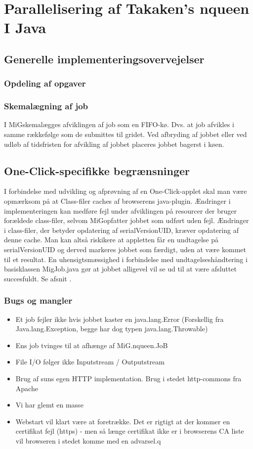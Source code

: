 \documentclass[draft,a4paper,10pt]{article}
\newcommand{\mig}{MiG}
\newcommand{\oc}{One-Click}
\begin{document}
\section{Parallelisering af Takaken's nqueen I Java}

\subsection{Generelle implementeringsovervejelser}
\subsubsection{Opdeling af opgaver}


\subsubsection{Skemalægning af job}
I \mig skemalægges afviklingen af job som en FIFO-kø. Dvs. at job afvikles i samme rækkefølge som de submittes til gridet. Ved afbryding af jobbet eller ved udløb af tidsfristen for afvikling af jobbet placeres jobbet bagerst i køen.  


\subsection{\oc-specifikke begrænsninger}

I forbindelse med udvikling og afprøvning af en \oc-applet skal man være opmærksom på at Class-filer caches af browserens java-plugin. Ændringer i implementeringen kan medføre fejl under afviklingen på resourcer der bruger forældede class-filer, selvom \mig opfatter jobbet som udført uden fejl. Ændringer i class-filer, der betyder opdatering af serialVersionUID, kræver opdatering af denne cache. Man kan altså riskikere at appletten får en undtagelse på serialVersionUID og derved markeres jobbet som færdigt, uden at være kommet til et resultat. En uhensigtsmæssighed i forbindelse med undtagelseshåndtering i basisklassen MigJob.java gør at jobbet alligevel vil se ud til at være afsluttet succesfuldt. Se afsnit \cite{bugs}. 


\subsubsection{Bugs og mangler}\label{bugs}
\begin{itemize}
	\item Et job fejler ikke hvis jobbet kaster en java.lang.Error (Forskellig fra Java.lang.Exception, begge har dog typen java.lang.Throwable)
	\item Ens job tvinges til at afhænge af MiG.nqueen.JoB
	\item File I/O følger ikke Inputstream / Outputstream	
	\item Brug af suns egen HTTP implementation. Brug i stedet http-commons fra Apache
	\item Vi har glemt en masse 
	\item Webstart vil klart være at foretrække. Det er rigtigt at der kommer en certifikat fejl (https) - men så længe certifikat ikke er i browserens CA liste vil browseren i stedet komme med en advarsel.q
\end{itemize}
\end{document}

